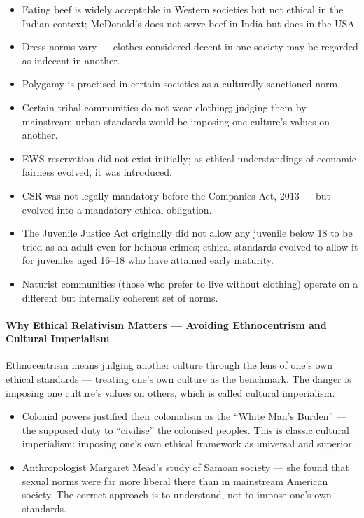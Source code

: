 \begin{ExampleBox}
\begin{itemize}
\item Eating beef is widely acceptable in Western societies but not ethical in the Indian context; McDonald's does not serve beef in India but does in the USA.
\item Dress norms vary --- clothes considered decent in one society may be regarded as indecent in another.
\item Polygamy is practised in certain societies as a culturally sanctioned norm.
\item Certain tribal communities do not wear clothing; judging them by mainstream urban standards would be imposing one culture's values on another.
\item EWS reservation did not exist initially; as ethical understandings of economic fairness evolved, it was introduced.
\item CSR was not legally mandatory before the Companies Act, 2013 --- but evolved into a mandatory ethical obligation.
\item The Juvenile Justice Act originally did not allow any juvenile below 18 to be tried as an adult even for heinous crimes; ethical standards evolved to allow it for juveniles aged 16--18 who have attained early maturity.
\item Naturist communities (those who prefer to live without clothing) operate on a different but internally coherent set of norms.
\end{itemize}
\end{ExampleBox}

\paragraph{Why Ethical Relativism Matters --- Avoiding Ethnocentrism and Cultural Imperialism} Ethnocentrism means judging another culture through the lens of one's own ethical standards --- treating one's own culture as the benchmark. The danger is imposing one culture's values on others, which is called cultural imperialism.

\begin{ExampleBox}
\begin{itemize}
\item Colonial powers justified their colonialism as the ``White Man's Burden'' --- the supposed duty to ``civilise'' the colonised peoples. This is classic cultural imperialism: imposing one's own ethical framework as universal and superior.
\item Anthropologist Margaret Mead's study of Samoan society --- she found that sexual norms were far more liberal there than in mainstream American society. The correct approach is to understand, not to impose one's own standards.
\end{itemize}
\end{ExampleBox}


